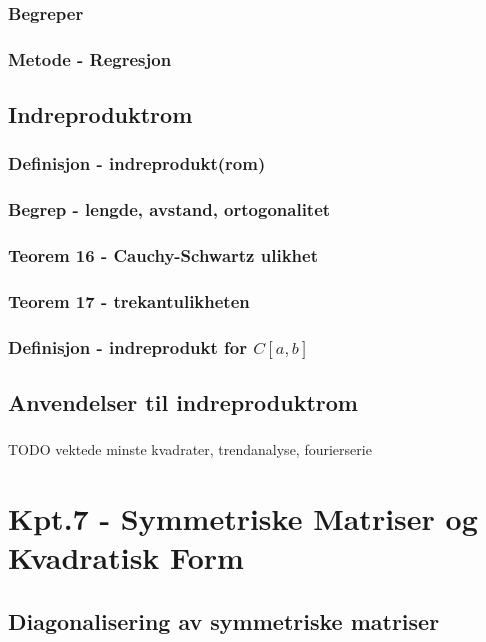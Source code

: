 \documentclass{article}
\begin{document}
      \subsubsection{Begreper}
        
      \subsubsection{Metode - Regresjon}
        
    \subsection{Indreproduktrom}
      \subsubsection{Definisjon - indreprodukt(rom)}
        
      \subsubsection{Begrep - lengde, avstand, ortogonalitet}
        
      \subsubsection{Teorem 16 - Cauchy-Schwartz ulikhet}
        
      \subsubsection{Teorem 17 - trekantulikheten}
        
      \subsubsection{Definisjon - indreprodukt for $C[a,b]$}
        
    \subsection{Anvendelser til indreproduktrom}
      \subsubsection{}
        TODO vektede minste kvadrater, trendanalyse, fourierserie
  \section{Kpt.7 - Symmetriske Matriser og Kvadratisk Form}
    \subsection{Diagonalisering av symmetriske matriser}
\end{document}
